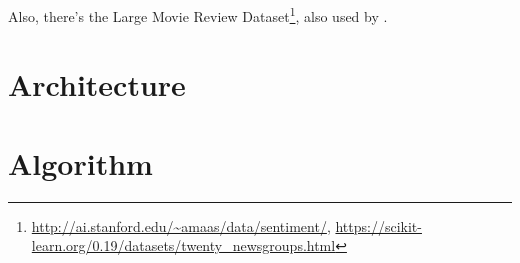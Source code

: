 Also, there's the Large Movie Review Dataset\footnote{\url{http://ai.stanford.edu/~amaas/data/sentiment/}, \url{https://scikit-learn.org/0.19/datasets/twenty_newsgroups.html}}, also used by \cite{Ager2018}.


\section{Architecture}
\label{sec:architecture}


\cite{Molder2021a}





\section{Algorithm}

